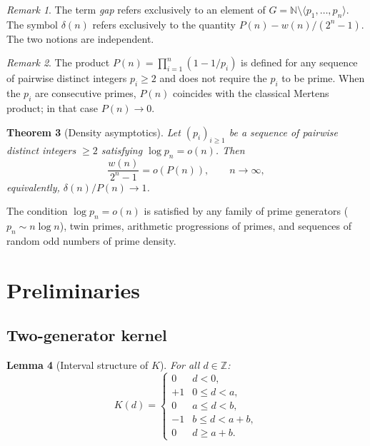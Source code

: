 \documentclass[11pt,a4paper]{amsart}
\theoremstyle{plain}
\newtheorem{theorem}{Theorem}[section]
\newtheorem{lemma}[theorem]{Lemma}
\theoremstyle{definition}
\theoremstyle{remark}
\newtheorem{remark}[theorem]{Remark}
\begin{document}
\begin{remark}
\label{rem:terminology}
The term \emph{gap} refers exclusively to an element of
$G = \mathbb{N} \setminus \langle p_1,\ldots,p_n \rangle$.
The symbol $\delta(n)$ refers exclusively to the quantity $P(n) - w(n)/(2^n-1)$.
The two notions are independent.
\end{remark}

\begin{remark}
\label{rem:mertens}
The product $P(n) = \prod_{i=1}^n (1 - 1/p_i)$ is defined
for any sequence of pairwise distinct integers $p_i \geq 2$
and does not require the $p_i$ to be prime.
When the $p_i$ are consecutive primes, $P(n)$ coincides with
the classical Mertens product; in that case $P(n) \to 0$.
\end{remark}

\begin{theorem}[Density asymptotics]
\label{thm:density}
Let $(p_i)_{i \geq 1}$ be a sequence of pairwise distinct
integers $\geq 2$ satisfying $\log p_n = o(n)$.
Then
\[
  \frac{w(n)}{2^n - 1} = o(P(n)), \qquad n \to \infty,
\]
equivalently, $\delta(n)/P(n) \to 1$.
\end{theorem}

The condition $\log p_n = o(n)$ is satisfied by any family
of prime generators ($p_n \sim n \log n$), twin primes,
arithmetic progressions of primes, and sequences of random
odd numbers of prime density.

\section{Preliminaries}
\label{sec:prelim}

\subsection*{Two-generator kernel}

\begin{lemma}[Interval structure of $K$]
\label{lem:K-intervals}
For all $d \in \mathbb{Z}$:
\[
  K(d) =
  \begin{cases}
     0  & d < 0,            \\
    +1  & 0 \leq d < a,     \\
     0  & a \leq d < b,     \\
    -1  & b \leq d < a+b,   \\
     0  & d \geq a+b.
  \end{cases}
\]
\end{lemma}
\end{document}
